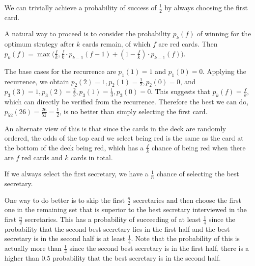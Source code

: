 \begin{comment}
The second probability comes from writing $P(M_1 \leq t) = 
P(M_1 \in [0,\alpha) \cup M_1 \in [\alpha,t]$ with the
two subevents being disjoint.

Differentiating the CDF, we see the Probability Distribution Function    (PDF) for $M_1$ is given by 
\begin{eqnarray*}
p_{M_1}(t) & = & \alpha, t < \alpha \\
p_{M_1}(t) & = & 1-\alpha, t \geq \alpha
\end{eqnarray*}

Suppose we choose $\alpha_1$ as our threshold and our opponent
chooses $\alpha_2$ as his threshold.  Let his final
number be $M_2$. Then the probability that $M_1 > M_2$ can
be computed as follows:

\end{comment}


We can trivially achieve a probability of success of $\frac{1}{2}$ by always choosing the first card.

A natural way to proceed is to consider the probability
$p_k(f)$ of winning for the optimum strategy after $k$ cards
remain, of which $f$ are red cards.
Then $p_k(f) = \max\big(\frac{f}{k}, 
\frac{f}{k}\cdot p_{k-1}(f-1) + (1-\frac{f}{k})\cdot p_{k-1}(f)\big)$.  

The base cases for the recurrence are $p_1(1) = 1$ and $p_1(0) = 0$.
Applying the recurrence, we obtain $p_2(2) = 1, p_2(1) = \frac{1}{2},
p_2(0) = 0$, and $p_3(3) = 1, p_3(2) = \frac{2}{3}, p_3(1) = \frac{1}{3},
p_3(0) = 0$.  This suggests that $p_k(f) = \frac{f}{k}$, which
can directly be verified from the recurrence. Therefore the best
we can do, $p_{52}(26) = \frac{26}{52} = \frac{1}{2}$, is no better than simply selecting
the first card.

An alternate view of this is that since the cards in the deck are
randomly ordered, the odds of the top card we select being red is the same
as the card at the bottom of the deck being red, which has a $\frac{f}{k}$ chance of
being red when there are $f$ red cards and $k$ cards in total.


If we always select the first secretary, we have a $\frac{1}{n}$ chance of
selecting the best secretary.

One way to do better is to skip the first $\frac{n}{2}$ secretaries
and then choose the first one in the remaining set that is superior to
the best secretary interviewed in the first $\frac{n}{2}$ secretaries. This 
has a probability of succeeding of at least $\frac{1}{4}$ since 
the probability that the second best secretary lies in the first half
and the best secretary is in the second half is at least $\frac{1}{4}$. Note that the probability of this is actually more than $\frac{1}{4}$
since the second best secretary is in the first half, there is a higher than
$0.5$ probability that the best secretary is in the second half.

